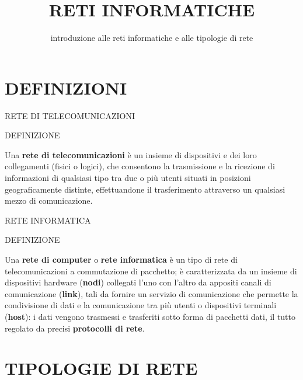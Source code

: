 \documentclass[aspectratio=1610, handout]{beamer}
\title{RETI INFORMATICHE}
\subtitle{introduzione alle reti informatiche e alle tipologie di rete}
\date{}
\institute{\textit{
        Fonti:
        \begin{itemize}
            \item[-] \href{https://it.wikipedia.org/wiki/Rete_di_computer}{Wikipedia}
            \item[-] \href{https://www.cappellieditore.it/testi/skills-box/}{SkillsBox}
        \end{itemize}
    }
}
\begin{document}
\begin{frame}
    \titlepage
\end{frame}

\section{DEFINIZIONI}

\begin{frame}{RETE DI TELECOMUNICAZIONI}
    \begin{alertblock}{DEFINIZIONE}
        \begin{minipage}{0.98\linewidth}
            \justifying
            Una \textbf{rete di telecomunicazioni} è un insieme di dispositivi e dei loro collegamenti (fisici o logici),
            che consentono la trasmissione e la ricezione di informazioni di qualsiasi tipo tra due o più utenti situati 
            in posizioni geograficamente distinte, effettuandone il trasferimento attraverso un qualsiasi mezzo di comunicazione.
        \end{minipage}
    \end{alertblock}
\end{frame}

\begin{frame}{RETE INFORMATICA}
    \begin{alertblock}{DEFINIZIONE}
        \begin{minipage}{0.98\linewidth}
            \justifying
            Una \textbf{rete di computer} o \textbf{rete informatica} è un tipo di rete di telecomunicazioni a commutazione di pacchetto; 
            è caratterizzata da un insieme di dispositivi hardware (\textbf{nodi}) collegati l'uno con l'altro da appositi canali 
            di comunicazione (\textbf{link}), tali da fornire un servizio di comunicazione che permette la condivisione di dati e la 
            comunicazione tra più utenti o dispositivi terminali (\textbf{host}): i dati vengono trasmessi e trasferiti sotto forma di pacchetti 
            dati, il tutto regolato da precisi \textbf{protocolli di rete}.
        \end{minipage}
    \end{alertblock}
\end{frame}

\section{TIPOLOGIE DI RETE}
\end{document}
